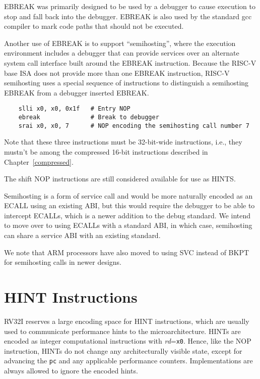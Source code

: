 \begin{commentary}
  EBREAK was primarily designed to be used by a debugger to cause
  execution to stop and fall back into the debugger. EBREAK is also
  used by the standard gcc compiler to mark code paths that should not
  be executed.

  Another use of EBREAK is to support ``semihosting'', where the
  execution environment includes a debugger that can provide services
  over an alternate system call interface built around the EBREAK
  instruction.  Because the RISC-V base ISA does not provide more than
  one EBREAK instruction, RISC-V semihosting uses a special sequence of
  instructions to distinguish a semihosting EBREAK from a debugger
  inserted EBREAK.
\begin{verbatim}
    slli x0, x0, 0x1f   # Entry NOP
    ebreak              # Break to debugger
    srai x0, x0, 7      # NOP encoding the semihosting call number 7
\end{verbatim}
   Note that these three instructions must be 32-bit-wide instructions,
   i.e., they mustn't be among the compressed 16-bit instructions
   described in Chapter~\ref{compressed}.

   The shift NOP instructions are still considered available for use as
   HINTS.

   Semihosting is a form of service call and would be more naturally
   encoded as an ECALL using an existing ABI, but this would require
   the debugger to be able to intercept ECALLs, which is a newer
   addition to the debug standard.  We intend to move over to using
   ECALLs with a standard ABI, in which case, semihosting can share a
   service ABI with an existing standard.

   We note that ARM processors have also moved to using SVC instead of
   BKPT for semihosting calls in newer designs.
\end{commentary}

\section{HINT Instructions}
\label{sec:rv32i-hints}

RV32I reserves a large encoding space for HINT instructions, which are
usually used to communicate performance hints to the
microarchitecture.  HINTs are encoded as integer computational
instructions with {\em rd}={\tt x0}.  Hence, like the NOP instruction,
HINTs do not change any architecturally visible state, except for
advancing the {\tt pc} and any applicable performance counters.
Implementations are always allowed to ignore the encoded hints.

